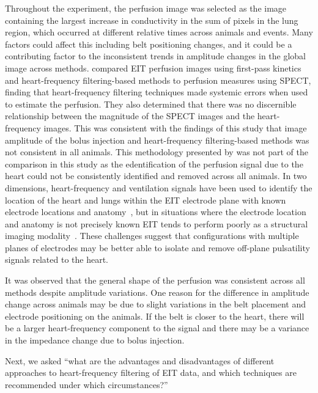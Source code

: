 Throughout the experiment, 
the perfusion image was selected as the image containing 
the largest increase in conductivity in the sum of pixels 
in the lung region, which occurred 
at different relative times across animals and events. Many factors could affect this
including belt positioning changes, and it could be a contributing factor 
to the inconsistent trends in amplitude changes in the global image across 
methods. 
compared EIT perfusion images using first-pass kinetics and 
heart-frequency filtering-based methods to perfusion measures using SPECT,
finding that heart-frequency filtering
techniques made systemic errors when used to estimate the perfusion. They also 
determined that there was no discernible relationship between the magnitude of the
SPECT images and the heart-frequency images.
This was consistent with the findings of this study that image amplitude of the bolus injection and 
heart-frequency filtering-based methods was not consistent in all animals.
This methodology presented by 
was not part of the comparison in this study as the edentification of the 
perfusion signal due to the heart could not be consistently
identified and removed across all animals.
In two dimensions, heart-frequency and ventilation signals 
have been used to identify the location 
of the heart and lungs within the EIT electrode plane with known electrode 
locations and anatomy~\parencite{ferrario_toward_2012}, but in situations where the electrode 
location and anatomy is not precisely known EIT tends to perform poorly as a structural 
imaging modality~\parencite{adler_electrical_2017}.
These challenges suggest that configurations with multiple planes of electrodes 
may be better able to isolate and remove off-plane 
pulsatility signals related to the heart.

It was observed that the general shape of 
the perfusion was consistent across all methods despite amplitude variations. 
One reason for the difference in amplitude change across animals may be due 
to slight variations in the belt placement and electrode positioning on the animals.
If the belt is closer to the heart, there will be a larger heart-frequency component 
to the signal and there may be a variance in the impedance change due to bolus injection.

Next, we asked ``what are the advantages and disadvantages of different approaches
to heart-frequency filtering of EIT data, and which techniques are recommended
under which circumstances?''

